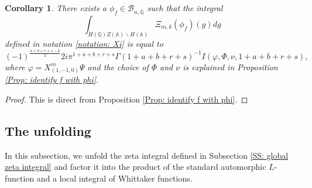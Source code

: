 \documentclass[11pt, a4paper]{amsart}
\theoremstyle{plain}
\newtheorem{corollary}[theorem]{Corollary}
\theoremstyle{definition}
\numberwithin{equation}{section}
\def\AAA{\mathbb{A}}
\def\QQ{\mathbb{Q}}
\begin{document}
\begin{corollary}
\label{corollary: identify integral of Xi and I}
    There exists a $\phi_f \in \mathcal{B}_{n, \overline{\QQ}}$ such that the integral
    \begin{equation*}
        \int_{H(\QQ) Z(\AAA) \backslash H(\AAA)} \Xi_{m, k}(\phi_f)(g) dg
    \end{equation*}
    defined in notation \ref{notation: Xi} is equal to 
    \begin{equation*}
        (-1)^{\frac{a + b + r + s - k}{2}} 2i \pi^{1 +a + b + r + s} \Gamma(1 + a + b + r + s)^{-1} I(\varphi, \Phi, \nu, 1 + a + b + r + s),
    \end{equation*}
    where $\varphi = X^{m}_{(1, -1, 0)} \Psi$ and the choice of $\Phi$ and $\nu$ is explained in Proposition \ref{Prop: identify f with phi}. 
\end{corollary}

\begin{proof}
    This is direct from Proposition \ref{Prop: identify f with phi}. 
\end{proof}


\subsection{The unfolding}
\label{SS: unfolding}
In this subsection, we unfold the zeta integral defined in Subsection \ref{SS: global zeta integral} and factor it into the product of the standard automorphic $L$-function and a local integral of Whittaker functions. 
\end{document}
